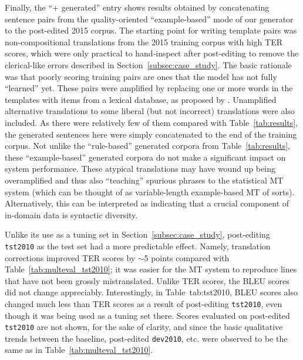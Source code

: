 {Finally, the ``+ generated'' entry %
shows results obtained by concatenating sentence pairs from the quality-oriented ``example-based'' mode of our generator to the post-edited 2015 corpus.
The starting point for writing template pairs was non-compositional translations from the 2015 training corpus with high TER scores, which were only practical to hand-inspect after post-editing to remove the clerical-like errors described in Section~\ref{subsec:case_study}.
The basic rationale was that poorly scoring training pairs are ones that the model has not fully ``learned'' yet.
These pairs were amplified by replacing one or more words in the templates with items from a lexical database, as proposed by .
Unamplified alternative translations to some liberal (but not incorrect) translations were also included.
As there were relatively few of them compared with Table~\ref{tab:results}, the generated sentences here were simply concatenated to the end of the training corpus.
Not unlike the ``rule-based'' generated corpora from Table~\ref{tab:results}, these ``example-based'' generated corpora do not make a significant impact on system performance. 
These atypical translations may have wound up being overamplified and thus also ``teaching'' spurious phrases to the statistical MT system (which can be thought of as variable-length example-based MT of sorts). 
Alternatively, this can be interpreted as indicating that a crucial component of in-domain data is syntactic diversity.

Unlike its use as a tuning set in Section~\ref{subsec:case_study}, post-editing {\small \tt tst2010} as the test set had a more predictable effect.
Namely, translation corrections improved TER scores by $\sim$5 points compared with Table~\ref{tab:multeval_tst2010}; it was easier for the MT system to reproduce lines that have not been grossly mistranslated.
Unlike TER scores, the BLEU scores did not change appreciably. %
Interestingly, in Table~{tab:tst2010}, BLEU scores also changed much less than TER scores as a result of post-editing {\small \tt tst2010}, even though it was being used as a tuning set there.
Scores evaluated on post-edited {\small \tt tst2010} are not shown, for the sake of clarity, and since the basic qualitative trends between the baseline, post-edited {\small \tt dev2010}, etc. were observed to be the same as in Table~\ref{tab:multeval_tst2010}.





}
